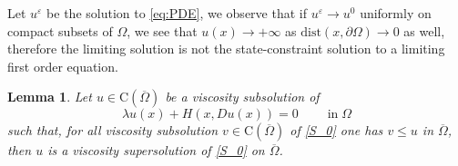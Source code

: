 \documentclass[11pt,reqno]{amsart}
\numberwithin{figure}{section}
\theoremstyle{plain}
\newtheorem{lem}[thm]{Lemma}
\theoremstyle{remark}
\numberwithin{equation}{section}
\newcommand{\rmC}{\mathrm{C}}
\begin{document}
Let $u^\varepsilon$ be the solution to \eqref{eq:PDE}, we observe that if $u^\varepsilon\rightarrow u^0$ uniformly on compact subsets of $\Omega$, we see that $u(x)\rightarrow +\infty$ as $\mathrm{dist}(x,\partial \Omega)\to 0$ as well, therefore the limiting solution is not the state-constraint solution to a limiting first order equation.

\begin{lem}\label{lem:max} Let $u\in \rmC(\overline{\Omega})$ be a viscosity subsolution of 
\begin{equation}\label{S_0}
 \lambda u(x) + H(x,Du(x)) = 0\;\qquad\text{in}\;\Omega
\end{equation}
such that, for all viscosity subsolution $v\in \rmC(\overline{\Omega})$ of \eqref{S_0} one has $v\leq u$ in $\overline{\Omega}$, then $u$ is a viscosity supersolution of \eqref{S_0} on $\overline{\Omega}$.
\end{lem}
\end{document}
